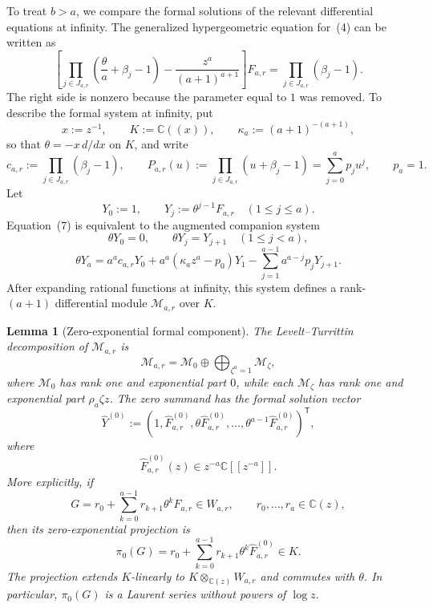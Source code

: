 \documentclass[12pt]{article}
\newtheorem{lemma}{Lemma}[section]
\begin{document}
To treat $b>a$, we compare the formal solutions of the relevant differential equations at infinity. The generalized hypergeometric equation for~(4) can be written as
\[
\left[
\prod_{j\in J_{a,r}}
\left(\frac{\theta}{a}+\beta_j-1\right)
-\frac{z^a}{(a+1)^{a+1}}
\right]F_{a,r}
=\prod_{j\in J_{a,r}}(\beta_j-1).
\tag{7}
\]
The right side is nonzero because the parameter equal to $1$ was removed. To describe the formal system at infinity, put
\[
x:=z^{-1},\qquad K:=\mathbb C((x)),\qquad \kappa_a:=(a+1)^{-(a+1)},
\]
so that $\theta=-x\,d/dx$ on $K$, and write
\[
c_{a,r}:=\prod_{j\in J_{a,r}}(\beta_j-1),\qquad P_{a,r}(u):=\prod_{j\in J_{a,r}}(u+\beta_j-1)=\sum_{j=0}^{a}p_ju^j,\qquad p_a=1.
\]
Let
\[
Y_0:=1,\qquad Y_j:=\theta^{j-1}F_{a,r}\quad(1\leq j\leq a).
\]
Equation~(7) is equivalent to the augmented companion system
\[
\theta Y_0=0,\qquad \theta Y_j=Y_{j+1}\quad(1\leq j<a),
\]
\[
\theta Y_a=a^ac_{a,r}Y_0+a^a(\kappa_a z^a-p_0)Y_1-\sum_{j=1}^{a-1}a^{a-j}p_jY_{j+1}.
\]
After expanding rational functions at infinity, this system defines a rank-$(a+1)$ differential module $\mathcal M_{a,r}$ over $K$.

\begin{lemma}[Zero-exponential formal component]
\label{lem:zero-component}
The Levelt--Turrittin decomposition of $\mathcal M_{a,r}$ is
\[
\mathcal M_{a,r}=\mathcal M_0\oplus\bigoplus_{\zeta^a=1}\mathcal M_\zeta,
\]
where $\mathcal M_0$ has rank one and exponential part $0$, while each $\mathcal M_\zeta$ has rank one and exponential part $\rho_a\zeta z$. The zero summand has the formal solution vector
\[
\widehat Y^{(0)}:=\left(1,\widehat F_{a,r}^{(0)},\theta\widehat F_{a,r}^{(0)},\ldots,\theta^{a-1}\widehat F_{a,r}^{(0)}\right)^{\mathsf T},
\]
where
\[
\widehat F_{a,r}^{(0)}(z)\in z^{-a}\mathbb C[[z^{-a}]].
\tag{8}
\]
More explicitly, if
\[
G=r_0+\sum_{k=0}^{a-1}r_{k+1}\theta^kF_{a,r}\in W_{a,r},\qquad r_0,\ldots,r_a\in\mathbb C(z),
\]
then its zero-exponential projection is
\[
\pi_0(G)=r_0+\sum_{k=0}^{a-1}r_{k+1}\theta^k\widehat F_{a,r}^{(0)}\in K.
\]
The projection extends $K$-linearly to $K\otimes_{\mathbb C(z)}W_{a,r}$ and commutes with $\theta$. In particular, $\pi_0(G)$ is a Laurent series without powers of $\log z$.
\end{lemma}
\end{document}
